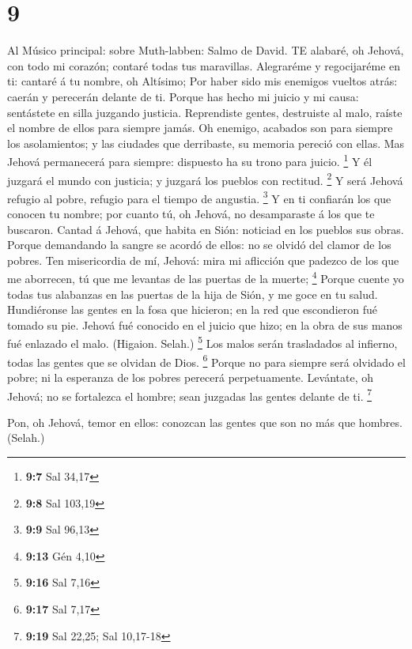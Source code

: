 \hypertarget{section-8}{%
\section{9}\label{section-8}}

 Al Músico principal: sobre Muth-labben: Salmo de David. TE
alabaré, oh Jehová, con todo mi corazón; contaré todas tus maravillas.
 Alegraréme y regocijaréme en ti: cantaré á tu nombre, oh
Altísimo;  Por haber sido mis enemigos vueltos atrás: caerán
y perecerán delante de ti.  Porque has hecho mi juicio y mi
causa: sentástete en silla juzgando justicia.  Reprendiste
gentes, destruiste al malo, raíste el nombre de ellos para siempre
jamás.  Oh enemigo, acabados son para siempre los
asolamientos; y las ciudades que derribaste, su memoria pereció con
ellas.  Mas Jehová permanecerá para siempre: dispuesto ha su
trono para juicio. \footnote{\textbf{9:7} Sal 34,17}  Y él
juzgará el mundo con justicia; y juzgará los pueblos con rectitud.
\footnote{\textbf{9:8} Sal 103,19}  Y será Jehová refugio al
pobre, refugio para el tiempo de angustia. \footnote{\textbf{9:9} Sal
  96,13}  Y en ti confiarán los que conocen tu nombre; por
cuanto tú, oh Jehová, no desamparaste á los que te buscaron.
 Cantad á Jehová, que habita en Sión: noticiad en los
pueblos sus obras.  Porque demandando la sangre se acordó
de ellos: no se olvidó del clamor de los pobres.  Ten
misericordia de mí, Jehová: mira mi aflicción que padezco de los que me
aborrecen, tú que me levantas de las puertas de la muerte; \footnote{\textbf{9:13}
  Gén 4,10}  Porque cuente yo todas tus alabanzas en las
puertas de la hija de Sión, y me goce en tu salud. 
Hundiéronse las gentes en la fosa que hicieron; en la red que
escondieron fué tomado su pie.  Jehová fué conocido en el
juicio que hizo; en la obra de sus manos fué enlazado el malo. (Higaion.
Selah.) \footnote{\textbf{9:16} Sal 7,16}  Los malos serán
trasladados al infierno, todas las gentes que se olvidan de Dios.
\footnote{\textbf{9:17} Sal 7,17}  Porque no para siempre
será olvidado el pobre; ni la esperanza de los pobres perecerá
perpetuamente.  Levántate, oh Jehová; no se fortalezca el
hombre; sean juzgadas las gentes delante de ti. \footnote{\textbf{9:19}
  Sal 22,25; Sal 10,17-18}

 Pon, oh Jehová, temor en ellos: conozcan las gentes que
son no más que hombres. (Selah.)

